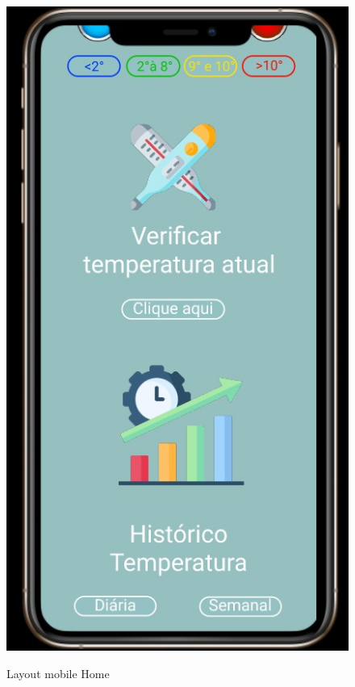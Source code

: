     \begin{figure}[ht]
        \caption{Layout mobile Home}
        \centering
        \includegraphics[scale=0.5]{img/mobile/home.jpeg}
        \label{fig:mobileHome}
    \end{figure}

